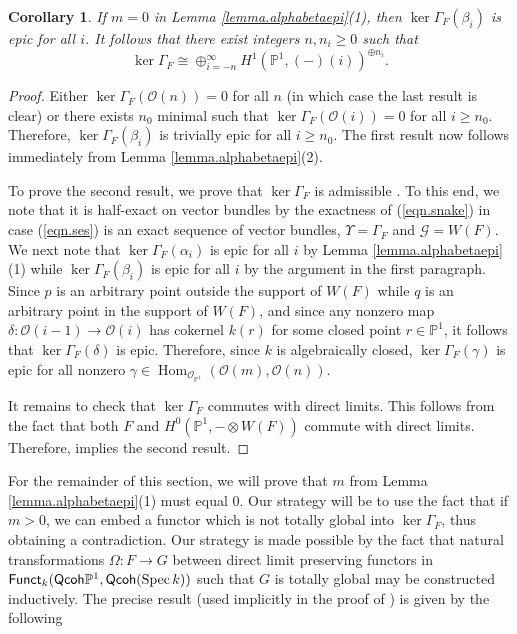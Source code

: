 \documentclass[10pt]{amsart}
\newtheorem{cor}[lemma]{Corollary}
\theoremstyle{definition}
\theoremstyle{remark}
\numberwithin{equation}{section}
\begin{document}
\begin{cor} \label{cor.kernelstructure}
If $m=0$ in Lemma \ref{lemma.alphabetaepi}(1), then ${\operatorname{ker }\Gamma_{F}}(\beta_{i})$ is epic for all $i$.  It follows that there exist integers $n,
n_{i} \geq 0$ such that
$$
{\operatorname{ker }\Gamma_{F}} \cong \oplus_{i=-n}^\infty {H}^{1}(\mathbb{P}^{1},(-)(i))^{\oplus n_{i}}.
$$
\end{cor}

\begin{proof}
Either ${\operatorname{ker }\Gamma_{F}}(\mathcal{O}(n)) = 0$ for all $n$ (in which case the last result is clear) or there exists $n_{0}$ minimal such that ${\operatorname{ker }\Gamma_{F}}(\mathcal{O}(i))=0$ for all $i \geq n_{0}$.  Therefore, ${\operatorname{ker }\Gamma_{F}}(\beta_{i})$ is trivially epic for all $i \geq n_{0}$.  The first result now follows immediately from Lemma \ref{lemma.alphabetaepi}(2).

To prove the second result, we prove that ${\operatorname{ker }\Gamma_{F}}$ is admissible \cite[Definition 7.1]{N}.  To this end, we note that it is half-exact on vector bundles by the exactness of (\ref{eqn.snake}) in case (\ref{eqn.ses}) is an exact sequence of vector bundles, $\Upsilon=\Gamma_{F}$ and $\mathcal{G}=W(F)$.  We next note that ${\operatorname{ker }\Gamma_{F}}(\alpha_{i})$ is epic for all $i$ by Lemma \ref{lemma.alphabetaepi}(1) while ${\operatorname{ker }\Gamma_{F}}(\beta_{i})$ is epic for all $i$ by the argument in the first paragraph. Since $p$ is an arbitrary point outside the support of $W(F)$ while $q$ is an arbitrary point in the support of $W(F)$, and since any nonzero map $\delta: \mathcal{O}(i-1) \rightarrow \mathcal{O}(i)$ has cokernel $k(r)$ for some closed point $r \in \mathbb{P}^{1}$, it follows that ${\operatorname{ker }\Gamma_{F}}(\delta)$ is epic.  Therefore, since $k$ is algebraically closed, ${\operatorname{ker }\Gamma_{F}}(\gamma)$ is epic for all nonzero $\gamma \in \operatorname{Hom}_{\mathcal{O}_{\mathbb{P}^{1}}}(\mathcal{O}(m),\mathcal{O}(n))$.

It remains to check that ${\operatorname{ker }\Gamma_{F}}$ commutes with direct limits.  This follows from the fact that both $F$ and $H^{0}(\mathbb{P}^{1},-\otimes W(F))$ commute with direct limits.  Therefore, \cite[Theorem 7.12]{N} implies the second result.
\end{proof}

For the remainder of this section, we will prove that $m$ from Lemma \ref{lemma.alphabetaepi}(1) must equal $0$. Our strategy will be to use the fact that if $m>0$, we can embed a functor which is not totally global into ${\operatorname{ker }\Gamma_{F}}$, thus obtaining a contradiction.  Our strategy is made possible by the fact that natural transformations $\Omega:F \rightarrow G$ between direct limit preserving functors in ${\sf Funct}_{k}({\sf Qcoh }\mathbb{P}^{1}, {\sf Qcoh }(\operatorname{Spec }k))$ such that $G$ is totally global may be constructed inductively.  The precise result (used implicitly in the proof of \cite[Proposition 7.6]{N}) is given by the following
\end{document}

